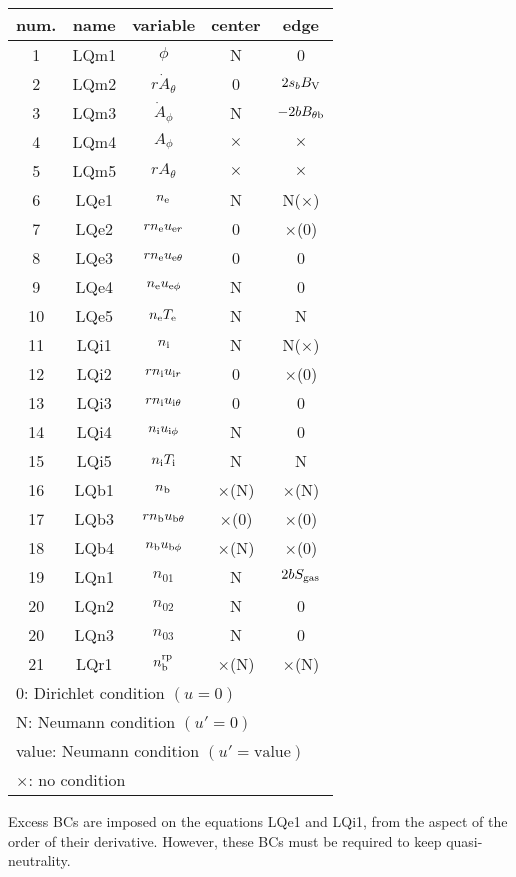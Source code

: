 \documentclass[11pt]{article}
\def\r#1{{\rm#1}}
\def\nee{n_\r{e}}
\def\ni{n_\r{i}}
\def\nb{n_\r{b}}
\def\uer{u_{\r{e}r}}
\def\uir{u_{\r{i}r}}
\def\ueth{u_{\r{e}\theta}}
\def\uith{u_{\r{i}\theta}}
\def\ubth{u_{\r{b}\theta}}
\def\ueph{u_{\r{e}\phi}}
\def\uiph{u_{\r{i}\phi}}
\def\ubph{u_{\r{b}\phi}}
\def\Athd{\dot{A}_\theta}
\def\Aphd{\dot{A}_\phi}
\def\Ath{A_\theta}
\def\Aph{A_\phi}
\def\Te{T_\r{e}}
\def\Ti{T_\r{i}}
\def\nna{n_{01}}
\def\nnb{n_{02}}
\def\nnc{n_{03}}
\def\nbrp{n_\r{b}^\r{rp}}
\begin{document}
\begin{tabular}{|c|c|c|c|c|}\hline
 num. & name & variable       & center & edge \\\hline
 1    & LQm1 & $\phi$         & N        & 0\\
 2    & LQm2 & $r \Athd$      & 0        & $2s_b B_\r{V}$\\
 3    & LQm3 & $\Aphd$        & N        & $-2bB_{\theta\r{b}}$\\
 4    & LQm4 & $\Aph$         & $\times$ & $\times$\\
 5    & LQm5 & $r \Ath$       & $\times$ & $\times$\\
 6    & LQe1 & $\nee$         & N        & N($\times$)\\
 7    & LQe2 & $r \nee \uer$  & 0        & $\times$(0)\\
 8    & LQe3 & $r \nee \ueth$ & 0        & 0\\
 9    & LQe4 & $\nee \ueph$   & N        & 0\\
 10   & LQe5 & $\nee \Te$     & N        & N\\
 11   & LQi1 & $\ni$          & N        & N($\times$)\\
 12   & LQi2 & $r \ni \uir$   & 0        & $\times$(0)\\
 13   & LQi3 & $r \ni \uith$  & 0        & 0\\
 14   & LQi4 & $\ni \uiph$    & N        & 0\\
 15   & LQi5 & $\ni \Ti$      & N        & N\\
 16   & LQb1 & $\nb$          & $\times$(N) & $\times$(N)\\
 17   & LQb3 & $r \nb \ubth$  & $\times$(0) & $\times$(0)\\
 18   & LQb4 & $\nb \ubph$    & $\times$(N) & $\times$(0)\\
 19   & LQn1 & $\nna$         & N        & $2bS_\r{gas}$\\
 20   & LQn2 & $\nnb$         & N        & 0\\
 20   & LQn3 & $\nnc$         & N        & 0\\
 21   & LQr1 & $\nbrp$        & $\times$(N) & $\times$(N)\\\hline
 \multicolumn{5}{l}{0: Dirichlet condition $(u=0)$}\\
 \multicolumn{5}{l}{N: Neumann condition $(u'=0)$}\\
 \multicolumn{5}{l}{value: Neumann condition $(u'=\mbox{value})$}\\
 \multicolumn{5}{l}{$\times$: no condition}
\end{tabular}

\medskip

Excess BCs are imposed on the equations LQe1 and LQi1, from the aspect
of the order of their derivative. However, these BCs must be required to
keep quasi-neutrality.
\end{document}
